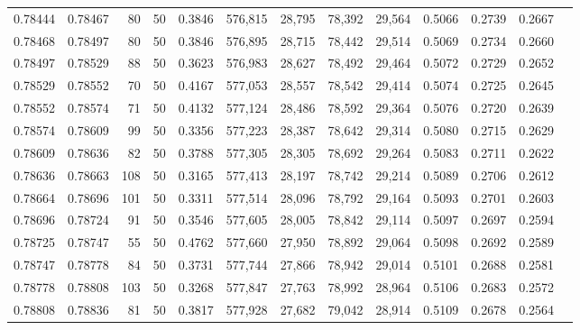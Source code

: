\begin{tabular}{rrrrrrrrrrrrr}
0.78444 & 0.78467 &    80 &  50 &                                     0.3846 & 576,815 &  28,795 &  78,392 &  29,564 & 0.5066 & 0.2739 & 0.2667 \\
0.78468 & 0.78497 &    80 &  50 &                                     0.3846 & 576,895 &  28,715 &  78,442 &  29,514 & 0.5069 & 0.2734 & 0.2660 \\
0.78497 & 0.78529 &    88 &  50 &                                     0.3623 & 576,983 &  28,627 &  78,492 &  29,464 & 0.5072 & 0.2729 & 0.2652 \\
0.78529 & 0.78552 &    70 &  50 &                                     0.4167 & 577,053 &  28,557 &  78,542 &  29,414 & 0.5074 & 0.2725 & 0.2645 \\
0.78552 & 0.78574 &    71 &  50 &                                     0.4132 & 577,124 &  28,486 &  78,592 &  29,364 & 0.5076 & 0.2720 & 0.2639 \\
0.78574 & 0.78609 &    99 &  50 &                                     0.3356 & 577,223 &  28,387 &  78,642 &  29,314 & 0.5080 & 0.2715 & 0.2629 \\
0.78609 & 0.78636 &    82 &  50 &                                     0.3788 & 577,305 &  28,305 &  78,692 &  29,264 & 0.5083 & 0.2711 & 0.2622 \\
0.78636 & 0.78663 &   108 &  50 &                                     0.3165 & 577,413 &  28,197 &  78,742 &  29,214 & 0.5089 & 0.2706 & 0.2612 \\
0.78664 & 0.78696 &   101 &  50 &                                     0.3311 & 577,514 &  28,096 &  78,792 &  29,164 & 0.5093 & 0.2701 & 0.2603 \\
0.78696 & 0.78724 &    91 &  50 &                                     0.3546 & 577,605 &  28,005 &  78,842 &  29,114 & 0.5097 & 0.2697 & 0.2594 \\
0.78725 & 0.78747 &    55 &  50 &                                     0.4762 & 577,660 &  27,950 &  78,892 &  29,064 & 0.5098 & 0.2692 & 0.2589 \\
0.78747 & 0.78778 &    84 &  50 &                                     0.3731 & 577,744 &  27,866 &  78,942 &  29,014 & 0.5101 & 0.2688 & 0.2581 \\
0.78778 & 0.78808 &   103 &  50 &                                     0.3268 & 577,847 &  27,763 &  78,992 &  28,964 & 0.5106 & 0.2683 & 0.2572 \\
0.78808 & 0.78836 &    81 &  50 &                                     0.3817 & 577,928 &  27,682 &  79,042 &  28,914 & 0.5109 & 0.2678 & 0.2564 \\

\end{tabular}
